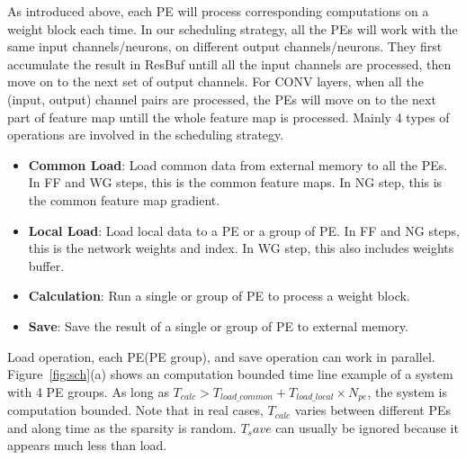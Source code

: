 As introduced above, each PE will process corresponding computations on a weight block each time. In our scheduling strategy, all the PEs will work with the same input channels/neurons, on different output channels/neurons. They first accumulate the result in ResBuf untill all the input channels are processed, then move on to the next set of output channels. For CONV layers, when all the (input, output) channel pairs are processed, the PEs will move on to the next part of feature map untill the whole feature map is processed. Mainly 4 types of operations are involved in the scheduling strategy.
\begin{itemize}
	\item {{\bf{Common Load}}: Load common data from external memory to all the PEs. In FF and WG steps, this is the common feature maps. In NG step, this is the common feature map gradient.}
    \item {{\bf{Local Load}}: Load local data to a PE or a group of PE. In FF and NG steps, this is the network weights and index. In WG step, this also includes weights buffer.}
    \item {{\bf{Calculation}}: Run a single or group of PE to process a weight block.}
    \item {{\bf{Save}}: Save the result of a single or group of PE to external memory.}
\end{itemize}
Load operation, each PE(PE group), and save operation can work in parallel. Figure~\ref{fig:sch}(a) shows an computation bounded time line example of a system with 4 PE groups. As long as $T_{calc}>T_{load\_common} + T_{load\_local}\times N_{pe}$, the system is computation bounded. Note that in real cases, $T_{calc}$ varies between different PEs and along time as the sparsity is random. $T_save$ can usually be ignored because it appears much less than load.   

